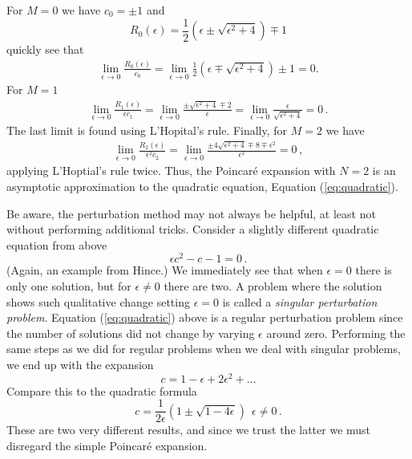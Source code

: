\begin{example}
	For $M=0$ we have $c_0= \pm 1$ and 
	\begin{equation}
		R_0(\epsilon) = \frac{1}{2}(\epsilon \pm \sqrt{\epsilon^2 + 4}) \mp 1
	\end{equation}
	quickly see that
	\begin{eqnarray}
		\lim_{\epsilon \rightarrow 0} \frac{R_0(\epsilon)}{c_0} = \lim_{\epsilon
		\rightarrow 0} \frac{1}{2}(\epsilon \mp \sqrt{\epsilon^2 + 4}) \pm 	1 =
		0.
	\end{eqnarray}
	For $M=1$
	\begin{eqnarray}
		\lim_{\epsilon \rightarrow 0} \frac{R_1(\epsilon)}{\epsilon c_1} 
		=\lim_{\epsilon \rightarrow 0} \frac{\pm \sqrt{\epsilon^2+4} \mp 2}{\epsilon} 
		= \lim_{\epsilon \rightarrow 0} \frac{\epsilon}{\sqrt{\epsilon^2+4}} = 0 \, .
    \end{eqnarray}
	The last limit is found using L'Hopital's rule. Finally, for $M=2$ we have 
	\begin{eqnarray}
		\lim_{\epsilon \rightarrow 0} \frac{R_2(\epsilon)}{\epsilon^2 c_2} 
		= \lim_{\epsilon \rightarrow 0} \frac{\pm 4\sqrt{\epsilon^2 +4} \mp 8 \mp \epsilon^2}{\epsilon^2} 
		= 0 \, ,
	\end{eqnarray}
	applying L'Hoptial's rule twice. Thus, the Poincar\'{e} expansion with $N=2$ is an 
	asymptotic approximation to the quadratic equation, Equation (\ref{eq:quadratic}). 
\end{example}

\noindent Be aware, the perturbation method may not always
be helpful, at least not without performing additional tricks. Consider a
slightly different quadratic equation from above  
\begin{equation}
  \epsilon c^2 -c -1 = 0 \, .
\end{equation}
(Again, an example from Hince.) We immediately see that when $\epsilon=0$ 
there is only one solution, but for $\epsilon \neq 0$ there are two. 
A problem where the solution
shows such qualitative change setting $\epsilon=0$ is called a
\emph{singular perturbation problem}. Equation (\ref{eq:quadratic}) above 
is a regular perturbation problem since the number of
solutions did not change by varying $\epsilon$ around zero.
Performing the same steps as we did for regular problems when we deal with 
singular problems, we end up with the expansion
\begin{equation}
  c = 1 -\epsilon + 2\epsilon^2 + \ldots
\end{equation}
Compare this to the quadratic formula
\begin{equation}
	\label{eq:quadricformulaPerturb}
  c = \frac{1}{2\epsilon}(1 \pm \sqrt{1-4\epsilon}) \ \ \epsilon  \neq 0 \, .
\end{equation}
These are two very different results, and since we trust the latter we must disregard the 
simple Poincar\'{e} expansion. 

